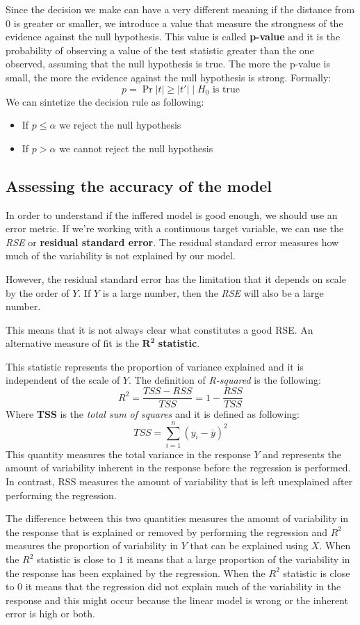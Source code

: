 Since the decision we make can have a very different meaning if the distance from 0 is greater or smaller, we introduce a value that measure the strongness of the evidence against the null hypothesis. This value is called \textbf{p-value} and it is the probability of observing a value of the test statistic greater than the one observed, assuming that the null hypothesis is true. The more the p-value is small, the more the evidence against the null hypothesis is strong. Formally:
\[
    p = \Pr{|t| \geq |t'|    \mid H_0 \text{ is true}}
\]
We can sintetize the decision rule as following:
\begin{itemize}
    \item If $p \leq \alpha$ we reject the null hypothesis
    \item If $p > \alpha$ we cannot reject the null hypothesis
\end{itemize}

\subsection{Assessing the accuracy of the model}
In order to understand if the inffered model is good enough, we should use an error metric. If we're working with a continuous target variable, we can use the \textit{RSE} or \textbf{residual standard error}. The residual standard error measures how much of the variability is not explained by our model.

However, the residual standard error has the limitation that it depends on scale by the order of $Y$. If $Y$ is a large number, then the \textit{RSE} will also be a large number.

This means that it is not always clear what constitutes a good RSE. An alternative measure of fit is the $\mathbf{R^2}$ \textbf{statistic}.

This statistic represents the proportion of variance explained and it is independent of the scale of $Y$. The definition of \textit{R-squared} is the following:
\[
    R^2 = \frac{TSS - RSS}{TSS} = 1 - \frac{RSS}{TSS}
\]
Where \textbf{TSS} is the \textit{total sum of squares} and it is defined as following:
\[
    TSS = \sum_{i=1}^{n} (y_i - \overline{y})^2
\]
This quantity measures the total variance in the response $Y$ and represents the amount of variability inherent in the response before the regression is performed. In contrast, RSS measures the amount of variability that is left unexplained after performing the regression.

The difference between this two quantities measures the amount of variability in the response that is explained or removed by performing the regression and $R^2$ measures the proportion of variability in $Y$ that can be explained using $X$.
When the $R^2$ statistic is close to $1$ it means that a large proportion of the variability in the response has been explained by the regression.
When the $R^2$ statistic is close to $0$ it means that the regression did not explain much of the variability in the response and this might occur because the linear model is wrong or the inherent error is high or both.

